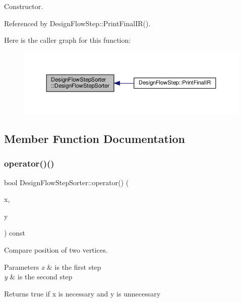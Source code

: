 Constructor. 



Referenced by Design\+Flow\+Step\+::\+Print\+Final\+I\+R().

Here is the caller graph for this function\+:
\nopagebreak
\begin{figure}[H]
\begin{center}
\leavevmode
\includegraphics[width=350pt]{d2/d4a/classDesignFlowStepSorter_aba239e01253a13cab075247c0eeab260_icgraph}
\end{center}
\end{figure}


\subsection{Member Function Documentation}
\mbox{\label{classDesignFlowStepSorter_a11d143ee9b2281c1cad9ca12868e979f}} 
\subsubsection{\texorpdfstring{operator()()}{operator()()}}
{\footnotesize\ttfamily bool Design\+Flow\+Step\+Sorter\+::operator() (\begin{DoxyParamCaption}\item[{const \hyperlink{design__flow__step_8hpp_a9dd6b4474ddf52d41a78b1aaa12ae6c8}{Design\+Flow\+Step\+Ref}}]{x,  }\item[{const \hyperlink{design__flow__step_8hpp_a9dd6b4474ddf52d41a78b1aaa12ae6c8}{Design\+Flow\+Step\+Ref}}]{y }\end{DoxyParamCaption}) const}



Compare position of two vertices. 


\begin{DoxyParams}{Parameters}
{\em x} & is the first step \\
\hline
{\em y} & is the second step \\
\hline
\end{DoxyParams}
\begin{DoxyReturn}{Returns}
true if x is necessary and y is unnecessary 
\end{DoxyReturn}


